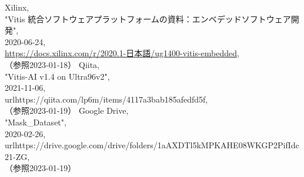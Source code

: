 \documentclass[11pt,a4j]{jreport}
\begin{document}
\begin{thebibliography}{99}
   Xilinx, \\"Vitis 統合ソフトウェアプラットフォームの資料：エンベデッドソフトウェア開発", \\2020-06-24, \\\url{https://docs.xilinx.com/r/2020.1-日本語/ug1400-vitis-embedded}, \\（参照2023-01-18）
   Qiita, \\"Vitis-AI v1.4 on Ultra96v2", \\2021-11-06, \\url{https://qiita.com/lp6m/items/4117a3bab185afedfd5f}, \\（参照2023-01-19）
   Google Drive, \\"Mask_Dataset", \\2020-02-26, \\url{https://drive.google.com/drive/folders/1aAXDTl5kMPKAHE08WKGP2PifIdc21-ZG}, \\（参照2023-01-19）
\end{thebibliography}
\end{document}
